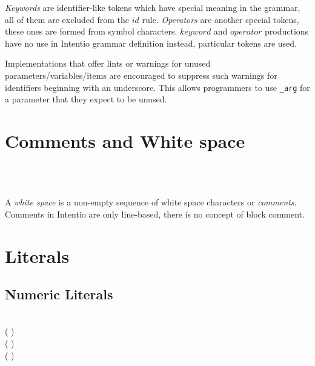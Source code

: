 \emph{Keywords} are identifier-like tokens which have special meaning in the grammar, all of them are excluded from the \(id\) rule. \emph{Operators} are another special tokens, these ones are formed from symbol characters. \(keyword\) and \(operator\) productions have no use in Intentio grammar definition instead, particular tokens are used.

Implementations that offer lints or warnings for unused parameters/variables/items are encouraged to suppress such warnings for identifiers beginning with an underscore. This allows programmers to use \texttt{\_arg} for a parameter that they expect to be unused.

\section{Comments and White space}

\begin{bnf}
   \eq {} \\
      \eq \term{\#} \  \ 
\end{bnf}

A \emph{white space} is a non-empty sequence of white space characters or \emph{comments}. Comments in Intentio are only line-based, there is no concept of block comment.

\section{Literals}

\begin{bnf}
   \eq {} \gor {} \gor {} \gor {}
\end{bnf}

\subsection{Numeric Literals}

\begin{bnf}
       \eq {} \  \\
        \eq ( \gor {}) \  \  \\
         \eq ( \gor {}) \  \  \\
   \eq ( \gor {}) \  \  \\
  \\
   \eq {} \gor {} \gor {} \gor {} \\
\end{bnf}

